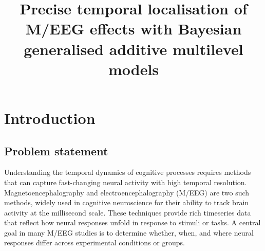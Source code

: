 \documentclass[
  doc,
  floatsintext,
  longtable,
  a4paper,
  nolmodern,
  notxfonts,
  notimes,
  colorlinks=true,linkcolor=blue,citecolor=blue,urlcolor=blue]{apa7}
\title{Precise temporal localisation of M/EEG effects with Bayesian
generalised additive multilevel models}
\begin{document}
\maketitle



\setcounter{secnumdepth}{3}

\setlength\LTleft{0pt}

\resetlinenumber[1]



\setlength{\parindent}{0pt}
\setlength{\parskip}{6pt}

\section{Introduction}\label{introduction}

\subsection{Problem statement}\label{problem-statement}

Understanding the temporal dynamics of cognitive processes requires
methods that can capture fast-changing neural activity with high
temporal resolution. Magnetoencephalography and electroencephalography
(M/EEG) are two such methods, widely used in cognitive neuroscience for
their ability to track brain activity at the millisecond scale. These
techniques provide rich timeseries data that reflect how neural
responses unfold in response to stimuli or tasks. A central goal in many
M/EEG studies is to determine whether, when, and where neural responses
differ across experimental conditions or groups.
\end{document}
